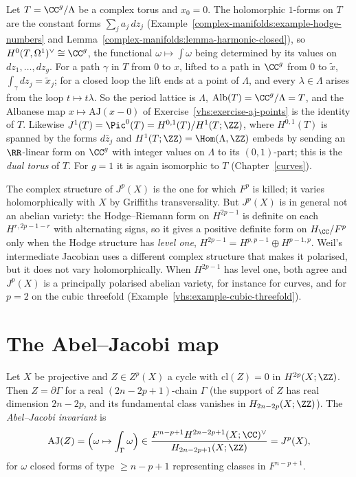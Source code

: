 \begin{example}\label{vhs:example-albanese-torus}
Let $T = \CC^g/\Lambda$ be a complex torus and $x_0 = 0$. The holomorphic $1$-forms on $T$ are the constant forms $\sum_ja_j\,dz_j$ (Example~\ref{complex-manifolds:example-hodge-numbers} and
Lemma~\ref{complex-manifolds:lemma-harmonic-closed}), so $H^0(T, \Omega^1)^\vee \cong \CC^g$, the functional $\omega \mapsto \int\omega$ being determined by its values on $dz_1, \ldots, dz_g$. For a path $\gamma$ in $T$
from $0$ to $x$, lifted to a path in $\CC^g$ from $0$ to $\tilde x$, $\int_\gamma dz_j = \tilde x_j$; for a closed loop the lift ends at a point of $\Lambda$, and every $\lambda \in \Lambda$ arises from the loop
$t \mapsto t\lambda$. So the period lattice is $\Lambda$, $\mathrm{Alb}(T) = \CC^g/\Lambda = T$, and the Albanese map $x \mapsto \mathrm{AJ}(x - 0)$ of Exercise~\ref{vhs:exercise-aj-points}
is the identity of $T$. Likewise $J^1(T) = \Pic^0(T) = H^{0,1}(T)/H^1(T; \ZZ)$, where $H^{0,1}(T)$ is spanned by the forms $d\bar z_j$ and $H^1(T; \ZZ) = \Hom(\Lambda, \ZZ)$ embeds by sending an $\RR$-linear form on $\CC^g$
with integer values on $\Lambda$ to its $(0,1)$-part; this is the \emph{dual torus} of $T$. For $g = 1$ it is again isomorphic to $T$ (Chapter~\ref{curves}).
\end{example}

\begin{remark}\label{vhs:remark-not-abelian}
The complex structure of $J^p(X)$ is the one for which $F^p$ is killed; it varies holomorphically with $X$ by Griffiths transversality. But $J^p(X)$ is in general not an abelian variety:
the Hodge--Riemann form on $H^{2p-1}$ is definite on each $H^{r,2p-1-r}$ with alternating signs, so it gives a positive definite form on $H_\CC/F^p$ only when the Hodge structure has
\emph{level one}, $H^{2p-1} = H^{p,p-1} \oplus H^{p-1,p}$. Weil's intermediate Jacobian uses a different complex structure that makes it polarised, but it does not vary holomorphically. When
$H^{2p-1}$ has level one, both agree and $J^p(X)$ is a principally polarised abelian variety, for instance for curves, and for $p = 2$ on the cubic threefold
(Example~\ref{vhs:example-cubic-threefold}).
\end{remark}

\section{The Abel--Jacobi map}\label{vhs:section-abel-jacobi}

\begin{definition}\label{vhs:definition-abel-jacobi}
Let $X$ be projective and $Z \in Z^p(X)$ a cycle with $\mathrm{cl}(Z) = 0$ in $H^{2p}(X; \ZZ)$. Then $Z = \partial\Gamma$ for a real $(2n - 2p + 1)$-chain $\Gamma$ (the support of $Z$ has real dimension
$2n - 2p$, and its fundamental class vanishes in $H_{2n-2p}(X; \ZZ)$). The \emph{Abel--Jacobi invariant} is
\[
\mathrm{AJ}(Z) = \Big(\omega \mapsto \int_\Gamma\omega\Big) \in \frac{F^{n-p+1}H^{2n-2p+1}(X; \CC)^\vee}{H_{2n-2p+1}(X; \ZZ)} = J^p(X),
\]
for $\omega$ closed forms of type $\geq n - p + 1$ representing classes in $F^{n-p+1}$.
\end{definition}

